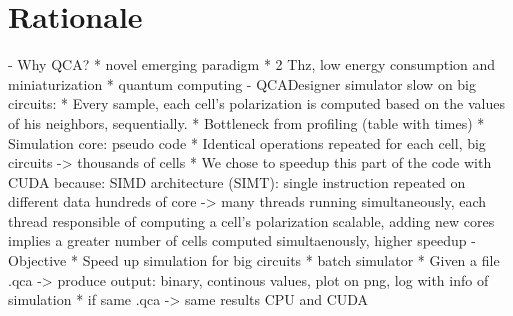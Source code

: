 \chapter{Rationale}\label{sec:rationale}

- Why QCA?
	* novel emerging paradigm
	* 2 Thz, low energy consumption and miniaturization
	* quantum computing
- QCADesigner simulator slow on big circuits:
	* Every sample, each cell's polarization is computed based on the values of his neighbors, sequentially.
	* Bottleneck from profiling (table with times)
	* Simulation core: pseudo code
	* Identical operations repeated for each cell, big circuits -> thousands of cells
	* We chose to speedup this part of the code with CUDA because:
		 SIMD architecture (SIMT): single instruction repeated on different data
		 hundreds of core -> many threads running simultaneously, each thread responsible of computing a cell's polarization
		 scalable, adding new cores implies a greater number of cells computed simultaenously, higher speedup
- Objective
	* Speed up simulation for big circuits
	* batch simulator
	* Given a file .qca -> produce output: binary, continous values, plot on png, log with info of simulation
	* if same .qca -> same results CPU and CUDA